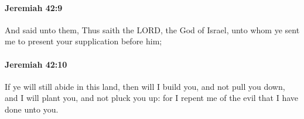 		\paragraph{Jeremiah 42:9} %
			\label{JEREMIAH-42-9}

			And said unto them, Thus saith the LORD, the God of Israel, unto whom ye sent me to present your supplication before him;


		\paragraph{Jeremiah 42:10} %
			\label{JEREMIAH-42-10}

			If ye will still abide in this land, then will I build you, and not pull you down, and I will plant you, and not pluck you up: for I repent me of the evil that I have done unto you.


